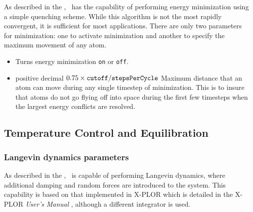 As described in the \PG, \NAMD\ has the capability
of performing energy minimization using a simple quenching
scheme.   While this algorithm is not the most rapidly convergent, it
is sufficient for most applications.  There are only two parameters
for minimization:  one to activate minimization and another
to specify the maximum movement of any atom.  

\begin{itemize}

\item
{}
{Turns energy minimization {\tt on} or {\tt off}.}

\item
{}
{positive decimal}
{$0.75\times\mbox{{\tt cutoff}}/\mbox{{\tt stepsPerCycle}}$}
{Maximum distance that an atom can move during any single timestep of
minimization.  This is to insure that atoms do not go flying off into
space during the first few timesteps when the largest energy conflicts
are resolved.}

\end{itemize}

\subsection{Temperature Control and Equilibration}

\subsubsection{Langevin dynamics parameters}

As described in the \PG, \NAMD\ is capable
of performing Langevin dynamics, where additional damping and
random forces are introduced to the system.  This capability
is based on that implemented in X-PLOR which is detailed
in the X-PLOR {\it User's Manual} ,
although a different integrator is used.


